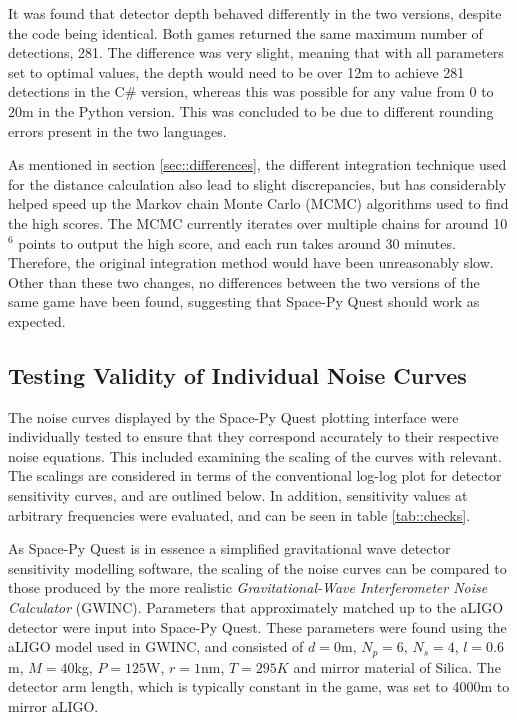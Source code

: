 \documentclass{article}
\begin{document}
It was found that detector depth behaved differently in the two versions, despite the code being identical. Both games returned the same maximum number of detections, 281. The difference was very slight, meaning that with all parameters set to optimal values, the depth would need to be over 12m to achieve 281 detections in the C\# version, whereas this was possible for any value from 0 to 20m in the Python version. This was concluded to be due to different rounding errors present in the two languages. 

As mentioned in section \ref{sec::differences}, the different integration technique used for the distance calculation also lead to slight discrepancies, but has considerably helped speed up the Markov chain Monte Carlo (MCMC) algorithms used to find the high scores. The MCMC currently iterates over multiple chains for around 10$^6$ points to output the high score, and each run takes around 30 minutes. Therefore, the original integration method would have been unreasonably slow. Other than these two changes, no differences between the two versions of the same game have been found, suggesting that Space-Py Quest should work as expected.


\subsection{Testing Validity of Individual Noise Curves}
The noise curves displayed by the Space-Py Quest plotting interface were individually tested to ensure that they correspond accurately to their respective noise equations. This included examining the scaling of the curves with relevant. The scalings are considered in terms of the conventional log-log plot for detector sensitivity curves, and are outlined below. In addition, sensitivity values at arbitrary frequencies were evaluated, and can be seen in table \ref{tab::checks}.


As Space-Py Quest is in essence a simplified gravitational wave detector sensitivity modelling software, the scaling of the noise curves can be compared to those produced by the more realistic \textit{Gravitational-Wave Interferometer Noise Calculator} (GWINC)\cite{GWINC}. Parameters that approximately matched up to the aLIGO detector were input into Space-Py Quest. These parameters were found using the aLIGO model used in GWINC, and consisted of $d=0$m, $N_p=6$, $N_s=4$, $l=0.6$m, $M =40$kg, $P=125$W, $r=1$nm, $T=295K$ and mirror material of Silica. The detector arm length, which is typically constant in the game, was set to 4000m to mirror aLIGO. 
\end{document}
